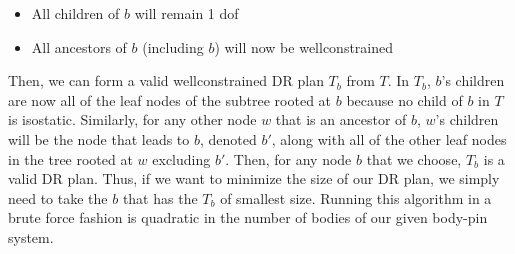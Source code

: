 \begin{itemize}
    \item All children of $b$ will remain 1 dof
    \item All ancestors of $b$ (including $b$) will now be wellconstrained
\end{itemize}

Then, we can form a valid wellconstrained DR plan $T_b$ from $T$. In $T_b$, $b$'s children are now all of the leaf nodes of the subtree rooted at $b$ because no child of $b$ in $T$ is isostatic. Similarly, for any other node $w$ that is an ancestor of $b$, $w$'s children will be the node that leads to $b$, denoted $b'$, along with all of the other leaf nodes in the tree rooted at $w$ excluding $b'$. Then, for any node $b$ that we choose, $T_b$ is a valid DR plan. Thus, if we want to minimize the size of our DR plan, we simply need to take the $b$ that has the $T_b$ of smallest size. Running this algorithm in a brute force fashion is quadratic in the number of bodies of our given body-pin system.

\begin{theorem}
\label{thm:35tight}

\end{theorem}

